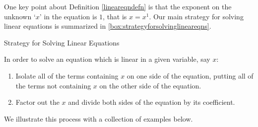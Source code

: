 One key point about Definition \ref{lineareqndefn} is that the exponent on the unknown `$x$' in the equation is $1$, that is $x = x^1$. Our main strategy for solving linear equations is summarized in \autoref{box:strategyforsolvinglineareqns}.

\begin{floatbox}[label=box:strategyforsolvinglineareqns]{Strategy for Solving Linear Equations}

In order to solve an equation which is linear in a given variable, say $x$:

\begin{enumerate}

\item  Isolate all of the terms containing $x$ on one side of the equation, putting all of the terms not containing $x$ on the other side of the equation.

\item  Factor out the $x$ and divide both sides of the equation by its coefficient.

\end{enumerate}

\end{floatbox}

We illustrate this process with a collection of examples below.

